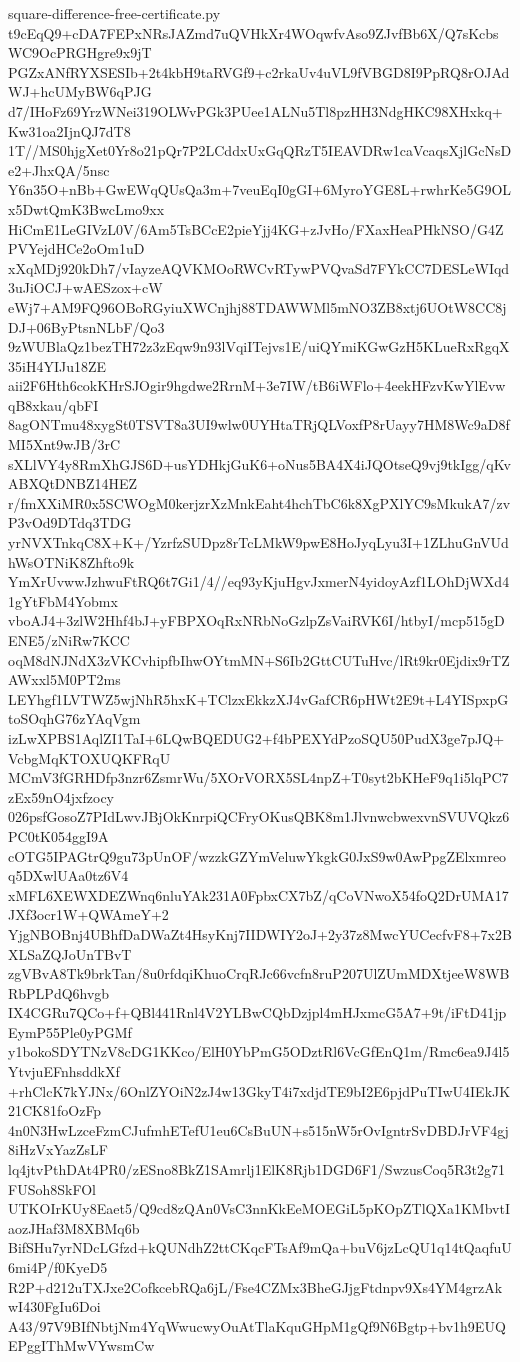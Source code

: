 \documentclass[11pt]{article}
\theoremstyle{definition}
\theoremstyle{remark}
\begin{document}
\begin{filecontents*}[overwrite]{square-difference-free-certificate.py}
t9cEqQ9+cDA7FEPxNRsJAZmd7uQVHkXr4WOqwfvAso9ZJvfBb6X/Q7sKcbsWC9OcPRGHgre9x9jT
PGZxANfRYXSESIb+2t4kbH9taRVGf9+c2rkaUv4uVL9fVBGD8I9PpRQ8rOJAdWJ+hcUMyBW6qPJG
d7/IHoFz69YrzWNei319OLWvPGk3PUee1ALNu5Tl8pzHH3NdgHKC98XHxkq+Kw31oa2IjnQJ7dT8
1T//MS0hjgXet0Yr8o21pQr7P2LCddxUxGqQRzT5IEAVDRw1caVcaqsXjlGcNsDe2+JhxQA/5nsc
Y6n35O+nBb+GwEWqQUsQa3m+7veuEqI0gGI+6MyroYGE8L+rwhrKe5G9OLx5DwtQmK3BwcLmo9xx
HiCmE1LeGIVzL0V/6Am5TsBCcE2pieYjj4KG+zJvHo/FXaxHeaPHkNSO/G4ZPVYejdHCe2oOm1uD
xXqMDj920kDh7/vIayzeAQVKMOoRWCvRTywPVQvaSd7FYkCC7DESLeWIqd3uJiOCJ+wAESzox+cW
eWj7+AM9FQ96OBoRGyiuXWCnjhj88TDAWWMl5mNO3ZB8xtj6UOtW8CC8jDJ+06ByPtsnNLbF/Qo3
9zWUBlaQz1bezTH72z3zEqw9n93lVqiITejvs1E/uiQYmiKGwGzH5KLueRxRgqX35iH4YIJu18ZE
aii2F6Hth6cokKHrSJOgir9hgdwe2RrnM+3e7IW/tB6iWFlo+4eekHFzvKwYlEvwqB8xkau/qbFI
8agONTmu48xygSt0TSVT8a3UI9wlw0UYHtaTRjQLVoxfP8rUayy7HM8Wc9aD8fMI5Xnt9wJB/3rC
sXLlVY4y8RmXhGJS6D+usYDHkjGuK6+oNus5BA4X4iJQOtseQ9vj9tkIgg/qKvABXQtDNBZ14HEZ
r/fmXXiMR0x5SCWOgM0kerjzrXzMnkEaht4hchTbC6k8XgPXlYC9sMkukA7/zvP3vOd9DTdq3TDG
yrNVXTnkqC8X+K+/YzrfzSUDpz8rTcLMkW9pwE8HoJyqLyu3I+1ZLhuGnVUdhWsOTNiK8Zhfto9k
YmXrUvwwJzhwuFtRQ6t7Gi1/4//eq93yKjuHgvJxmerN4yidoyAzf1LOhDjWXd41gYtFbM4Yobmx
vboAJ4+3zlW2Hhf4bJ+yFBPXOqRxNRbNoGzlpZsVaiRVK6I/htbyI/mcp515gDENE5/zNiRw7KCC
oqM8dNJNdX3zVKCvhipfbIhwOYtmMN+S6Ib2GttCUTuHvc/lRt9kr0Ejdix9rTZAWxxl5M0PT2ms
LEYhgf1LVTWZ5wjNhR5hxK+TClzxEkkzXJ4vGafCR6pHWt2E9t+L4YISpxpGtoSOqhG76zYAqVgm
izLwXPBS1AqlZI1TaI+6LQwBQEDUG2+f4bPEXYdPzoSQU50PudX3ge7pJQ+VcbgMqKTOXUQKFRqU
MCmV3fGRHDfp3nzr6ZsmrWu/5XOrVORX5SL4npZ+T0syt2bKHeF9q1i5lqPC7zEx59nO4jxfzocy
026psfGosoZ7PIdLwvJBjOkKnrpiQCFryOKusQBK8m1JlvnwcbwexvnSVUVQkz6PC0tK054ggI9A
cOTG5IPAGtrQ9gu73pUnOF/wzzkGZYmVeluwYkgkG0JxS9w0AwPpgZElxmreoq5DXwlUAa0tz6V4
xMFL6XEWXDEZWnq6nluYAk231A0FpbxCX7bZ/qCoVNwoX54foQ2DrUMA17JXf3ocr1W+QWAmeY+2
YjgNBOBnj4UBhfDaDWaZt4HsyKnj7IIDWIY2oJ+2y37z8MwcYUCecfvF8+7x2BXLSaZQJoUnTBvT
zgVBvA8Tk9brkTan/8u0rfdqiKhuoCrqRJc66vcfn8ruP207UlZUmMDXtjeeW8WBRbPLPdQ6hvgb
IX4CGRu7QCo+f+QBl441Rnl4V2YLBwCQbDzjpl4mHJxmcG5A7+9t/iFtD41jpEymP55Ple0yPGMf
y1bokoSDYTNzV8cDG1KKco/ElH0YbPmG5ODztRl6VcGfEnQ1m/Rmc6ea9J4l5YtvjuEFnhsddkXf
+rhClcK7kYJNx/6OnlZYOiN2zJ4w13GkyT4i7xdjdTE9bI2E6pjdPuTIwU4IEkJK21CK81foOzFp
4n0N3HwLzceFzmCJufmhETefU1eu6CsBuUN+s515nW5rOvIgntrSvDBDJrVF4gj8iHzVxYazZsLF
lq4jtvPthDAt4PR0/zESno8BkZ1SAmrlj1ElK8Rjb1DGD6F1/SwzusCoq5R3t2g71FUSoh8SkFOl
UTKOIrKUy8Eaet5/Q9cd8zQAn0VsC3nnKkEeMOEGiL5pKOpZTlQXa1KMbvtIaozJHaf3M8XBMq6b
BifSHu7yrNDcLGfzd+kQUNdhZ2ttCKqcFTsAf9mQa+buV6jzLcQU1q14tQaqfuU6mi4P/f0KyeD5
R2P+d212uTXJxe2CofkcebRQa6jL/Fse4CZMx3BheGJjgFtdnpv9Xs4YM4grzAkwI430FgIu6Doi
A43/97V9BIfNbtjNm4YqWwucwyOuAtTlaKquGHpM1gQf9N6Bgtp+bv1h9EUQEPggIThMwVYwsmCw

\end{filecontents*}
\end{document}
